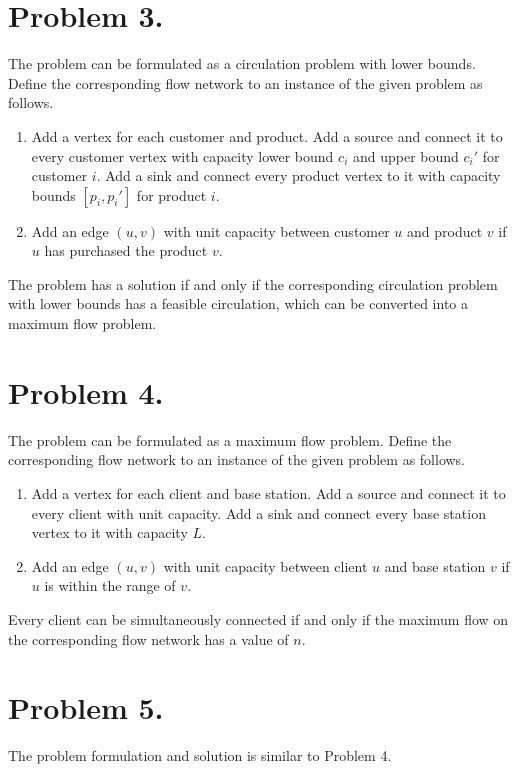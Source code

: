\documentclass{article}
\begin{document}
\section*{Problem 3.}

The problem can be formulated as a circulation problem with lower bounds. Define the corresponding flow network to an instance of the given problem as follows.
\begin{enumerate}
    \item Add a vertex for each customer and product. Add a source and connect it to every customer vertex with capacity lower bound $c_i$ and upper bound $c_i'$ for customer $i$. Add a sink and connect every product vertex to it with capacity bounds $[p_i, p_i']$ for product $i$.
    \item Add an edge $(u, v)$ with unit capacity between customer $u$ and product $v$ if $u$ has purchased the product $v$.
\end{enumerate}

The problem has a solution if and only if the corresponding circulation problem with lower bounds has a feasible circulation, which can be converted into a maximum flow problem.

\section*{Problem 4.}

The problem can be formulated as a maximum flow problem. Define the corresponding flow network to an instance of the given problem as follows.
\begin{enumerate}
    \item Add a vertex for each client and base station. Add a source and connect it to every client with unit capacity. Add a sink and connect every base station vertex to it with capacity $L$.
    \item Add an edge $(u, v)$ with unit capacity between client $u$ and base station $v$ if $u$ is within the range of $v$.
\end{enumerate}

Every client can be simultaneously connected if and only if the maximum flow on the corresponding flow network has a value of $n$.

\section*{Problem 5.}

The problem formulation and solution is similar to Problem 4.
\end{document}
